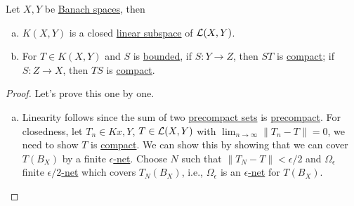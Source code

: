 \begin{proposition}
	Let \(X, Y\) be \hyperref[def:Banach-space]{Banach spaces}, then
	\begin{enumerate}[(a)]
		\item \(K(X, Y)\) is a closed \hyperref[def:linear-vector-space]{linear subspace} of \(\mathcal{\MakeUppercase{l}} (X, Y)\).
		\item For \(T\in K(X, Y)\) and \(S\) is \hyperref[def:bounded-map]{bounded}, if \(S\colon Y\to Z\), then \(ST\) is \hyperref[def:compact-op]{compact}; if \(S\colon Z\to X\), then \(TS\) is \hyperref[def:compact-op]{compact}.
	\end{enumerate}
\end{proposition}
\begin{proof}
	Let's prove this one by one.
	\begin{enumerate}[(a)]
		\item Linearity follows since the sum of two \hyperref[def:precompact]{precompact sets} is \hyperref[def:precompact]{precompact}. For closedness, let \(T_n\in Kx, Y\), \(T\in \mathcal{\MakeUppercase{l}} (X, Y)\) with \(\lim_{n \to \infty} \left\lVert T_n - T\right\rVert = 0\), we need to show \(T\) is \hyperref[def:compact-op]{compact}. We can show this by showing that we can cover \(T(B_X)\) by a finite \hyperref[def:eps-net]{\(\epsilon \)-net}. Choose \(N\) such that \(\left\lVert T_N - T\right\rVert < \epsilon / 2\) and \(\Omega _\epsilon \) finite \hyperref[def:eps-net]{\(\epsilon /2\)-net} which covers \(T_N(B_X)\), i.e., \(\Omega _\epsilon \) is an \hyperref[def:eps-net]{\(\epsilon \)-net} for \(T(B_X)\).
	\end{enumerate}
\end{proof}
